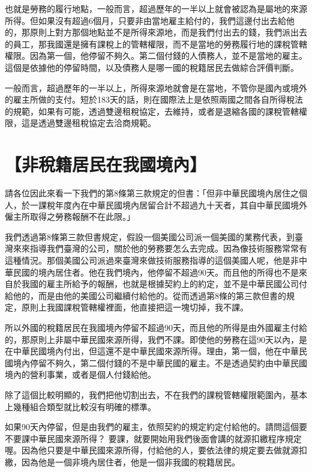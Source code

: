 \documentclass[]{ctexbook}
\begin{document}
也就是勞務的履行地點，一般而言，超過歷年的一半以上就會被認為是屬地的來源所得。但如果沒有超過6個月，只要非由當地雇主給付的，我們這邊付出去給他的，那原則上對方那個地點並不是所得來源地，而是我們付出去的錢，我們派出去的員工，那我國還是擁有課稅上的管轄權限，而不是當地的勞務履行地的課稅管轄權限。因為第一個，他停留不夠久。第二個付錢的人債務人，並不是當地的雇主。這個是依據他的停留時間，以及債務人是哪一國的稅籍居民去做綜合評價判斷。

一般而言，超過歷年的一半以上，所得來源地就會是在當地，不管你是國內或境外的雇主所做的支付。短於183天的話，則在國際法上是依照兩國之間各自所得稅法的規範，如果有可能，透過雙邊租稅協定，去維持，或者是退縮各國的課稅管轄權限，這是透過雙邊租稅協定去洽商規範。

\hypertarget{ux975eux7a05ux7c4dux5c45ux6c11ux5728ux6211ux570bux5883ux5167}{%
\section{【非稅籍居民在我國境內】}\label{ux975eux7a05ux7c4dux5c45ux6c11ux5728ux6211ux570bux5883ux5167}}

請各位因此來看一下我們的第8條第三款規定的但書：「但非中華民國境內居住之個人，於一課稅年度內在中華民國境內居留合計不超過九十天者，其自中華民國境外僱主所取得之勞務報酬不在此限。」

我們透過第8條第三款但書規定，假設一個美國公司派一個美國的業務代表，到臺灣來來指導我們臺灣的公司，關於他的勞務要怎么去完成。因為像技術服務常常有這種情況。那個美國公司派過來臺灣來做技術服務指導的這個美國人呢，他是非中華民國的境內居住者。他在我們境內，他停留不超過90天。而且他的所得也不是來自於我國的雇主所給予的報酬，也就是根據契約上的約定，並不是中華民國公司付給他的，而是由他的美國公司繼續付給他的。從而透過第8條的第三款但書的規定，原則上我國課稅管轄權裡面，他直接把這一塊切掉，我不課。

所以外國的稅籍居民在我國境內停留不超過90天，而且他的所得是由外國雇主付給的，那原則上非屬中華民國來源所得，我們不課。即使他的勞務在這90天以內，是在中華民國境內付出，但這還不是中華民國來源所得。理由，第一個，他在中華民國境內停留不夠久，第二個付錢的不是中華民國的雇主。不是透過契約由中華民國境內的營利事業，或者是個人付錢給他。

除了這個比較明顯的，我們把他切割出去，不在我們的課稅管轄權限範圍內，基本上幾種組合類型就比較沒有明確的標準。

如果90天內停留，但是由我們的雇主，依照契約的規定約定付給他的。請問這個要不要課中華民國來源所得？ 要課，就要開始用我們後面會講的就源扣繳程序規定喔。因為他只要是中華民國來源所得，付給他的人，要依法律的規定要去做就源扣繳，因為他是一個非境內居住者，他是一個非我國的稅籍居民。
\end{document}
